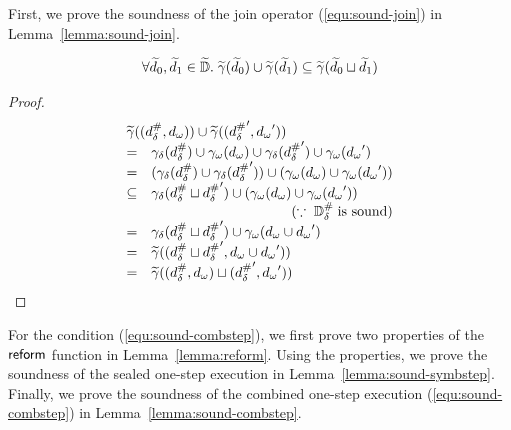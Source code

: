 First, we prove the soundness of the join operator (\ref{equ:sound-join}) in
Lemma~\ref{lemma:sound-join}.
\begin{lemma}\label{lemma:sound-join}
  \[
    \forall \widetilde{d}_0, \widetilde{d}_1 \in \widetilde{\mathbb{D}}. \; \widetilde{\gamma}(\widetilde{d}_0) \cup
    \widetilde{\gamma}(\widetilde{d}_1) \subseteq \widetilde{\gamma}(\widetilde{d}_0 \sqcup \widetilde{d}_1)
  \]
\end{lemma}
\begin{proof}
  \[
    \begin{array}{cl}
      \multicolumn{2}{l}{
        \combgamma((\sabselem, \symbelem)) \cup \combgamma((\sabselem', \symbelem'))
      }\\
      =& \sgamma(\sabselem) \cup \symbgamma(\symbelem)
      \cup \sgamma(\sabselem') \cup \symbgamma(\symbelem')\\
      =& (\sgamma(\sabselem)\cup \sgamma(\sabselem'))
      \cup (\symbgamma(\symbelem) \cup \symbgamma(\symbelem'))\\
      \subseteq& \sgamma(\sabselem \join \sabselem')
      \cup (\symbgamma(\symbelem) \cup \symbgamma(\symbelem'))\\
      & \multicolumn{1}{r}{(\because \; \sabsdom \; \text{is sound})}\\
      =& \sgamma(\sabselem \join \sabselem')
      \cup \symbgamma(\symbelem \cup \symbelem')\\
      =& \combgamma((\sabselem \join \sabselem', \symbelem \cup \symbelem'))\\
      =& \combgamma((\sabselem, \symbelem) \join (\sabselem', \symbelem'))\\
    \end{array}
  \]
\end{proof}

For the condition (\ref{equ:sound-combstep}), we first prove two properties of the
$\textsf{reform}$ function in Lemma~\ref{lemma:reform}.  Using the properties, we prove
the soundness of the sealed one-step execution in
Lemma~\ref{lemma:sound-symbstep}.  Finally, we prove the soundness of the
combined one-step execution (\ref{equ:sound-combstep}) in
Lemma~\ref{lemma:sound-combstep}.

